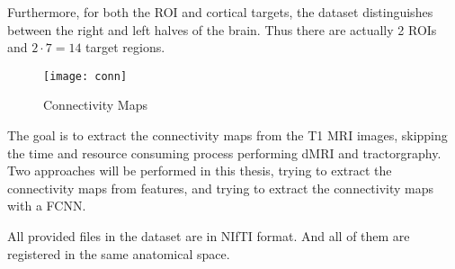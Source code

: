Furthermore, for both the \ac{ROI} and cortical targets, the dataset distinguishes between the right and left halves of the brain. Thus there are actually 2 \ac{ROI}s and $2 \cdot 7=14$ target regions.

\begin{figure}[H]
\centering
\texttt{[image: conn]}
\caption{Connectivity Maps}
\label{fig:conn}
\end{figure}

The goal is to extract the connectivity maps from the T1 \ac{MRI} images, skipping the time and resource consuming process performing \ac{dMRI} and tractorgraphy. Two approaches will be performed in this thesis, trying to extract the connectivity maps from  features, and trying to extract the connectivity maps with a \ac{FCNN}.\par

All provided files in the dataset are in \ac{NIfTI} format. And all of them are registered in the same anatomical space.\par
